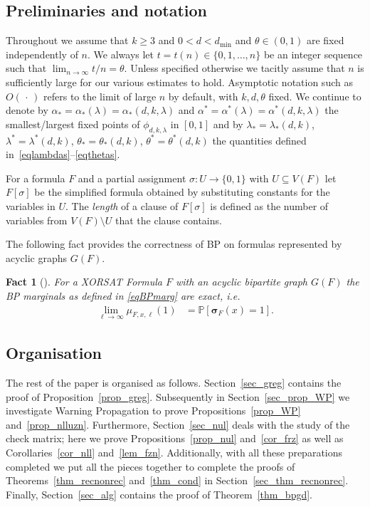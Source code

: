 \documentclass[10pt,reqno]{amsart}
\numberwithin{equation}{section}
\renewcommand{\vec}[1]{\boldsymbol{#1}}
\renewcommand{\subset}{\subseteq}
\newcommand\dmin{d_{\mathrm{min}}}
\newcommand\nix{\,\cdot\,}
\newcommand\SIGMA{\vec\sigma}
\newcommand\brk[1]{\left\lbrack{#1}\right\rbrack}
\newcommand\pr{\mathbb{P}}
\newcommand\Prop{Proposition}
\newcommand\Thm{Theorem}
\newcommand\Sec{Section}
\newtheorem{fact}[definition]{Fact}
\def\pr{{\mathbb P}}
\newcommand{\ph}{\phi_{d,k,\lambda}}
\begin{document}
\subsection{Preliminaries and notation}\label{sec_notation}
Throughout we assume that $k\geq3$ and $0<d<\dmin$ and $\theta\in(0,1)$ are fixed independently of $n$.
We always let $t=t(n)\in\{0,1,\ldots,n\}$ be an integer sequence such that $\lim_{n\to\infty}t/n=\theta$.
Unless specified otherwise we tacitly assume that $n$ is sufficiently large for our various estimates to hold.
Asymptotic notation such as $O(\nix)$ refers to the limit of large $n$ by default, with $k,d,\theta$ fixed.
We continue to denote by $\alpha_*=\alpha_*(\lambda)=\alpha_*(d,k,\lambda)$ and $\alpha^*=\alpha^*(\lambda)=\alpha^*(d,k,\lambda)$ the smallest/largest fixed points of $\ph$ in $[0,1]$ and by $\lambda_*=\lambda_*(d,k)$, $\lambda^*=\lambda^*(d,k)$, $\theta_*=\theta_*(d,k)$, $\theta^*=\theta^*(d,k)$ the quantities defined in~\eqref{eqlambdas}--\eqref{eqthetas}.

For a formula $F$ and a partial assignment $\sigma:U\to\{0,1\}$ with $U\subset V(F)$ let $F[\sigma]$ be the simplified formula obtained by substituting constants for the variables in $U$.
The {\em length} of a clause of $F[\sigma]$ is defined as the number of variables from $V(F)\setminus U$ that the clause contains.

	The following fact provides the correctness of BP on formulas represented by acyclic graphs $G(F)$.
	\begin{fact}[{\cite[Chapter 14]{MM}}]\label{fact_BP_acyclic}
		For a XORSAT Formula $F$ with an acyclic bipartite graph $G(F)$ the BP marginals as defined in \eqref{eqBPmarg} are exact, i.e.
		\begin{align*}
			\lim_{\ell \to \infty}\mu_{F,x,\ell}(1) &=\pr\brk{\SIGMA_{F}(x)=1}.
		\end{align*}
	\end{fact}


\subsection{Organisation}\label{sec_org}
The rest of the paper is organised as follows.
\Sec~\ref{sec_greg} contains the proof of \Prop~\ref{prop_greg}.
Subsequently in \Sec~\ref{sec_prop_WP} we investigate Warning Propagation to prove \Prop s~\ref{prop_WP} and~\ref{prop_nlluzn}.
Furthermore, \Sec~\ref{sec_nul} deals with the study of the check matrix; here we prove \Prop s~\ref{prop_nul} and~\ref{cor_frz} as well as Corollaries~\ref{cor_nll} and~\ref{lem_fzn}.
Additionally, with all these preparations completed we put all the pieces together to complete the proofs of \Thm s~\ref{thm_recnonrec} and~\ref{thm_cond} in \Sec~\ref{sec_thm_recnonrec}.
Finally, \Sec~\ref{sec_alg} contains the proof of \Thm~\ref{thm_bpgd}.
\end{document}
